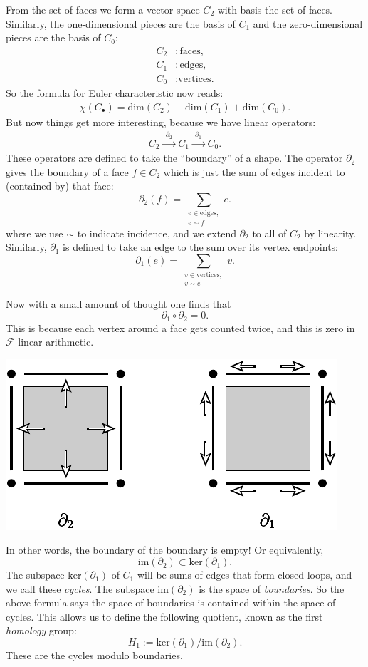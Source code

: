 \documentclass[11pt,twoside,openright]{report}
\newcommand{\Field}{\mathcal{F}}
\def\Im{\mathrm{im}}
\def\Ker{\mathrm{ker}}
\def\euler{\chi}
\begin{document}
From the set of faces we form a vector space
$C_2$ with basis the set of faces.
Similarly, the one-dimensional pieces are the basis of $C_1$
and the zero-dimensional pieces are the basis of $C_0$:
\begin{align*}
    C_2 &: \mbox{faces},\\
    C_1 &: \mbox{edges},\\
    C_0 &: \mbox{vertices.}
\end{align*}
So the formula for Euler characteristic now reads:
\begin{align}\label{EulerEq}
    \euler(C_{\bullet}) = \mbox{dim}(C_2) - \mbox{dim}(C_1) + \mbox{dim}(C_0).
\end{align}
But now things get more interesting,
because we have linear operators:
\begin{align}\label{Sequence}
    C_2 \xrightarrow{\ \ \partial_2\ \ } C_1 \xrightarrow{\ \ \partial_1\ \ } C_0.
\end{align}
These operators are defined to take the ``boundary'' of a shape. 
The operator $\partial_2$ gives the boundary of a face $f\in C_2$
which is just the sum of edges incident to (contained by) that face:
$$
    \partial_2(f) = \sum_{\substack{e\in \text{edges},\\e\sim f}} e.
$$
where we use $\sim$ to indicate incidence, and we extend
$\partial_2$ to all of $C_2$ by linearity.
Similarly, $\partial_1$ is defined to take an edge
to the sum over its vertex endpoints:
$$
    \partial_1(e) = \sum_{\substack{v\in \text{vertices},\\v\sim e}} v.
$$

Now with a small amount of thought one finds that 
$$
    \partial_1 \circ \partial_2 = 0.
$$
This is because each vertex around a face gets counted twice,
and this is zero in $\Field$-linear arithmetic.
\begin{center}
\includegraphics{pic-bdy.pdf}
\end{center}
In other words, the boundary of the boundary is empty!
Or equivalently,
$$
    \Im(\partial_2) \subset \Ker(\partial_1).
$$
The subspace $\Ker(\partial_1)$ of $C_1$
will be sums of edges that form closed loops, and we
call these \emph{cycles}.
The subspace $\Im(\partial_2)$ is the space of \emph{boundaries}.
So the above formula
says the space of boundaries is contained within the space of cycles.
This allows us to define the following quotient,
known as the first \emph{homology} group:
$$
    H_1 := \Ker(\partial_1) / \Im(\partial_2).
$$
These are the cycles modulo boundaries.
\end{document}
